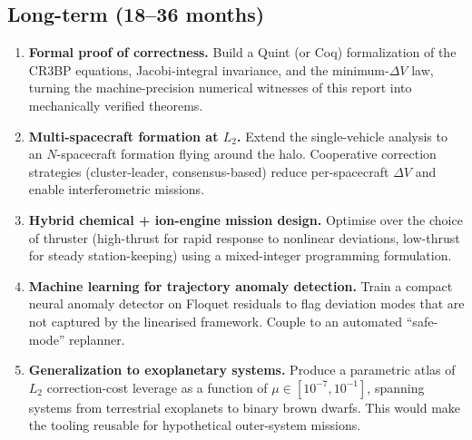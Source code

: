 \documentclass[11pt,a4paper]{article}
\begin{document}
\subsection*{Long-term (18--36 months)}
\begin{enumerate}[resume,leftmargin=*]
  \item \textbf{Formal proof of correctness.}
    Build a Quint (or Coq) formalization of the CR3BP equations, Jacobi-integral invariance, and the minimum-$\Delta V$ law, turning the machine-precision numerical witnesses of this report into mechanically verified theorems.
  \item \textbf{Multi-spacecraft formation at $L_2$.}
    Extend the single-vehicle analysis to an $N$-spacecraft formation flying around the halo. Cooperative correction strategies (cluster-leader, consensus-based) reduce per-spacecraft $\Delta V$ and enable interferometric missions.
  \item \textbf{Hybrid chemical + ion-engine mission design.}
    Optimise over the choice of thruster (high-thrust for rapid response to nonlinear deviations, low-thrust for steady station-keeping) using a mixed-integer programming formulation.
  \item \textbf{Machine learning for trajectory anomaly detection.}
    Train a compact neural anomaly detector on Floquet residuals to flag deviation modes that are not captured by the linearised framework. Couple to an automated ``safe-mode'' replanner.
  \item \textbf{Generalization to exoplanetary systems.}
    Produce a parametric atlas of $L_2$ correction-cost leverage as a function of $\mu \in [10^{-7}, 10^{-1}]$, spanning systems from terrestrial exoplanets to binary brown dwarfs. This would make the tooling reusable for hypothetical outer-system missions.
\end{enumerate}
\end{document}
